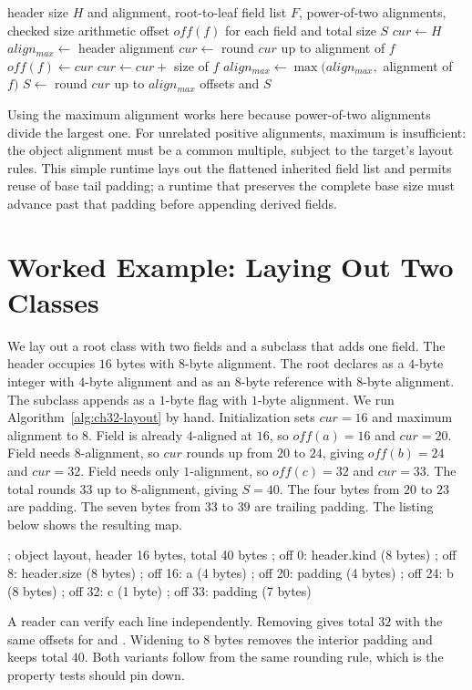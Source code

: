 \begin{algorithm}[htbp]
\caption{Field offset assignment for single-inheritance classes}\label{alg:ch32-layout}
\begin{pseudocode}
\Require header size $H$ and alignment, root-to-leaf field list $F$, power-of-two alignments, checked size arithmetic
\Ensure offset $off(f)$ for each field and total size $S$
\State $cur \gets H$
\State $align_{max} \gets$ header alignment
\State $cur \gets$ round $cur$ up to alignment of $f$
\State $off(f) \gets cur$
\State $cur \gets cur +$ size of $f$
\State $align_{max} \gets \max(align_{max},$ alignment of $f)$
\EndFor
\State $S \gets$ round $cur$ up to $align_{max}$
\State \Return offsets and $S$
\end{pseudocode}
\end{algorithm}

Using the maximum alignment works here because power-of-two alignments divide the largest one.
For unrelated positive alignments, maximum is insufficient: the object alignment must be a common multiple, subject to the target's layout rules.
This simple runtime lays out the flattened inherited field list and permits reuse of base tail padding; a runtime that preserves the complete base size must advance past that padding before appending derived fields.

\section{Worked Example: Laying Out Two Classes}\label{sec:ch32-worked}

We lay out a root class with two fields and a subclass that adds one field.
The header occupies $16$ bytes with $8$-byte alignment.
The root declares  as a $4$-byte integer with $4$-byte alignment and  as an $8$-byte reference with $8$-byte alignment.
The subclass appends  as a $1$-byte flag with $1$-byte alignment.
We run Algorithm~\ref{alg:ch32-layout} by hand.
Initialization sets $cur = 16$ and maximum alignment to $8$.
Field  is already $4$-aligned at $16$, so $off(a) = 16$ and $cur = 20$.
Field  needs $8$-alignment, so $cur$ rounds up from $20$ to $24$, giving $off(b) = 24$ and $cur = 32$.
Field  needs only $1$-alignment, so $off(c) = 32$ and $cur = 33$.
The total rounds $33$ up to $8$-alignment, giving $S = 40$.
The four bytes from $20$ to $23$ are padding.
The seven bytes from $33$ to $39$ are trailing padding.
The listing below shows the resulting map.
\begin{irlisting}
; object layout, header 16 bytes, total 40 bytes
; off 0:  header.kind (8 bytes)
; off 8:  header.size (8 bytes)
; off 16: a (4 bytes)
; off 20: padding (4 bytes)
; off 24: b (8 bytes)
; off 32: c (1 byte)
; off 33: padding (7 bytes)
\end{irlisting}
A reader can verify each line independently.
Removing  gives total $32$ with the same offsets for  and .
Widening  to $8$ bytes removes the interior padding and keeps total $40$.
Both variants follow from the same rounding rule, which is the property tests should pin down.

